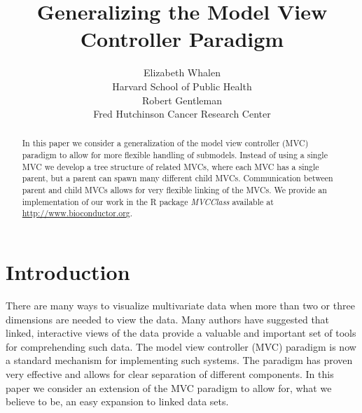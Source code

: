 \documentclass[11pt]{article}
\newcommand{\Rpackage}[1]{{\textit{#1}}}
\begin{document}


\author{Elizabeth Whalen\\Harvard School of Public Health \\ 
        Robert Gentleman\\Fred Hutchinson Cancer Research Center}
\title{Generalizing the Model View Controller Paradigm}

\maketitle

\begin{abstract} 
In this paper we consider a generalization of the model
  view controller (MVC) paradigm to allow for more flexible handling
  of submodels. Instead of using a single MVC we develop a tree
  structure of related MVCs, where each MVC has a single parent, but a
  parent can spawn many different child MVCs. Communication between
  parent and child MVCs allows for very flexible linking of the
  MVCs. We provide an implementation of our work in the R package
\Rpackage{MVCClass} available at \url{http://www.bioconductor.org}. 
\end{abstract}


\section{Introduction}
\label{Sec:Intro}




There are many ways to visualize multivariate data when more than
two or three dimensions are needed to view the data.  Many authors
\citep{intGrUnwin, DynGraphics, IEEEVisual, GGobi, DataDesk}
have suggested that linked, interactive views of the data
provide a valuable and important set of tools for comprehending such
data.  The model view controller (MVC) paradigm is now a standard
mechanism for implementing such systems.  The paradigm has proven very
effective and allows for clear separation of different components.
In this paper we consider an extension of the MVC paradigm to allow
for, what we believe to be, an easy expansion to linked data sets.
\end{document}
